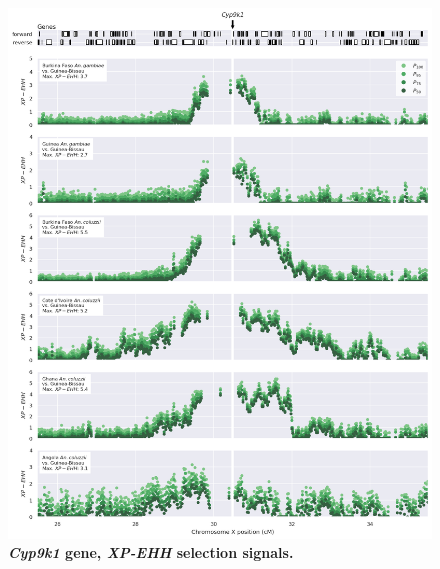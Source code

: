 \documentclass[a4paper,11pt,abstracton,hidelinks]{scrartcl}
\begin{document}
\begin{figure}[t!]
	\begin{center}
		\includegraphics*[width=1.1\linewidth,center]{artwork/locus_cyp9k1_xpehh.png}
	\end{center}
	\caption[\textit{Cyp9k1} gene, \textit{XP-EHH} selection signals]{
	\textbf{\textit{Cyp9k1} gene, \textit{XP-EHH} selection signals.}
	} 
	\label{fig:locus_cyp9k1_xpehh}
\end{figure}


\clearpage
\end{document}
